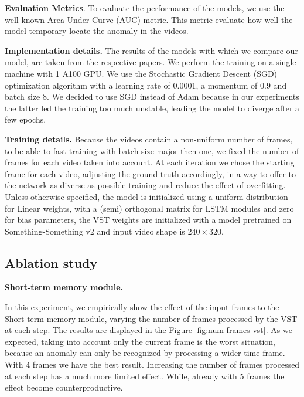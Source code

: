 \noindent\textbf{Evaluation Metrics}.
To evaluate the performance of the models, we use the well-known Area Under Curve (AUC) metric.
This metric evaluate how well the model temporary-locate the anomaly in the videos.

\noindent\textbf{Implementation details.}
The results of the models with which we compare our model, are taken from the respective papers.
We perform the training on a single machine with 1 A100 GPU.
We use the Stochastic Gradient Descent (SGD) optimization algorithm with a learning rate of 0.0001, a momentum of 0.9 and batch size 8.
We decided to use SGD instead of Adam because in our experiments the latter led the training too much unstable, leading the model to diverge after a few epochs.

\noindent\textbf{Training details.}
Because the videos contain a non-uniform number of frames, to be able to fast training with batch-size major then one, we fixed the number of frames for each video taken into account.
At each iteration we chose the starting frame for each video, adjusting the ground-truth accordingly, in a way to offer to the network as diverse as possible training and reduce the effect of overfitting.
Unless otherwise specified, the model is initialized using a uniform distribution for Linear weights, with a (semi) orthogonal matrix for LSTM modules and zero for bias parameters, the VST weights are initialized with a model pretrained on Something-Something v2 and input video shape is $240 \times 320$.

\subsection{Ablation study}


\noindent\textbf{Short-term memory module.}

In this experiment, we empirically show the effect of the input frames to the Short-term memory module, varying the number of frames processed by the VST at each step.
The results are displayed in the Figure \ref{fig:num-frames-vst}.
As we expected, taking into account only the current frame is the worst situation, because an anomaly can only be recognized by processing a wider time frame.
With 4 frames we have the best result.
Increasing the number of frames processed at each step has a much more limited effect.
While, already with 5 frames the effect become counterproductive.

